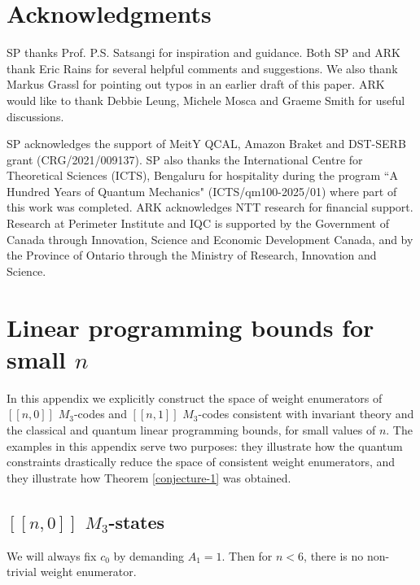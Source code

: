 \documentclass[11pt]{article}
\begin{document}
\section*{Acknowledgments}
SP thanks Prof. P.S. Satsangi for inspiration and guidance. Both SP and ARK thank Eric Rains for several helpful comments and suggestions. We also thank Markus Grassl for pointing out typos in an earlier draft of this paper. ARK would like to thank Debbie Leung, Michele Mosca and Graeme Smith for useful discussions.

SP acknowledges the support of MeitY QCAL, Amazon Braket and DST-SERB grant (CRG/2021/009137). SP also thanks the International Centre for Theoretical Sciences (ICTS), Bengaluru for hospitality during the program ``A Hundred Years of Quantum Mechanics" (ICTS/qm100-2025/01) where part of this work was completed.
ARK acknowledges NTT research for financial support.  Research at Perimeter Institute and IQC is supported by the Government of Canada through Innovation, Science and Economic Development Canada, and by the Province of Ontario through the Ministry of Research, Innovation and Science.

\appendix

\section{Linear programming bounds for small $n$}
\label{app:small-examples}
In this appendix we explicitly construct the space of weight enumerators of  $[[n,0]]$ $M_3$-codes and $[[n,1]]$ $M_3$-codes consistent with invariant theory and the classical and quantum linear programming bounds,  for small values of $n$. The examples in this appendix serve two purposes: they illustrate how the quantum constraints drastically reduce the space of consistent weight enumerators, and they illustrate how Theorem \ref{conjecture-1} was obtained. 

\subsection{$[[n,0]]$ $M_3$-states}

We will always fix $c_0$ by demanding $A_1=1$. Then for $n<6$, there is no non-trivial weight enumerator. 
\end{document}
